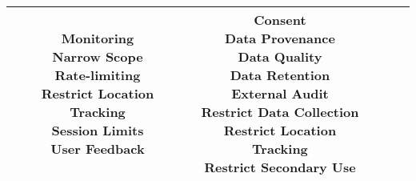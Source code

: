 \documentclass[fleqn]{article}
\begin{document}
\begin{landscape}
\begin{table}[H]
\begin{tabular}{|c|c|c|c|c|}
{			\textbullet\hspace{3pt} Monitoring\\ 	
			\textbullet\hspace{3pt} Narrow Scope\\ 
			\textbullet\hspace{3pt} Rate-limiting \\ 
			\textbullet\hspace{3pt} Restrict Location Tracking\\ 					
			\textbullet\hspace{3pt} Session Limits\\ 
			\textbullet\hspace{3pt} User Feedback\\ 		 	 	 
		} & \makecell[l]{
			\textbullet\hspace{3pt} Consent\\ 	
			\textbullet\hspace{3pt} Data Provenance\\ 	
			\textbullet\hspace{3pt} Data Quality\\ 	
			\textbullet\hspace{3pt} Data Retention\\ 	
			\textbullet\hspace{3pt} External Audit\\ 	
			\textbullet\hspace{3pt} Restrict Data Collection\\ 			
			\textbullet\hspace{3pt} Restrict Location Tracking\\ 		 
			\textbullet\hspace{3pt} Restrict Secondary Use\\ 		 
		}
		\\
		\hline
	\end{tabular}
	\label{table:med_risk_plan_by_gai_risk}
\end{table}

\vfill
\raisebox{-10pt}{\makebox[\linewidth]{\thepage}}

\pagebreak
\thispagestyle{empty}


\end{landscape}
\end{document}

